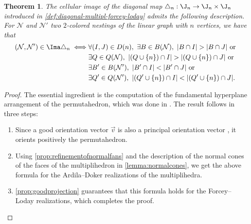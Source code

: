 \documentclass[JEP,XML,SOM,NoFloatCountersInSection,Unicode,published]{cedram}
\theoremstyle{definition}
\theoremstyle{plain}
\newtheorem{theorem}{Theorem}
\begin{document}
\begin{theorem}
\label{thm:formuladiagonal}
The cellular image of the diagonal map $\triangle_n : \J_n \to \J_n \times \J_n$ introduced in \cref{def:diagonal-multipl-forcey-loday} admits the following description.
For $\mathcal{N}$ and $\mathcal{N}'$ two $2$-colored nestings of the linear graph with $n$ vertices, we have that
\begin{align*}
(\mathcal{N},\mathcal{N}') \in \Ima\triangle_n
\iff & \forall (I,J) \in D(n),\ \exists B \in B(\mathcal{N}),\ |B\cap I|>|B\cap J| \text{ or } \\
& \exists Q \in Q(\mathcal{N}),\ |(Q\cup \{n\}) \cap I|>| (Q\cup \{n\}) \cap J| \text{ or } \\
& \exists B' \in B(\mathcal{N}'),\ |B'\cap I|<|B'\cap J| \text{ or } \\
& \exists Q' \in Q(\mathcal{N}'),\ |(Q'\cup \{n\}) \cap I|<| (Q'\cup \{n\}) \cap J|.
\end{align*}
\end{theorem}

\begin{proof}
The essential ingredient is the computation of the fundamental hyperplane arrangement of the permutahedron, which was done in \cite[\S 3.1]{LA21}. The result follows in three steps:
\begin{enumerate}
\item Since a good orientation vector $\vec v$ is also a principal orientation vector \cite[Def.\,3.15]{LA21}, it orients positively the permutahedron.
\item Using \cref{prop:refinementofnormalfans} and the description of the normal cones of the faces of the multiplihedron in \cref{lemma:normalcones}, we get the above formula for the Ardila--Doker realizations of the multiplihedra.
\item \cref{prop:goodprojection} guarantees that this formula holds for the Forcey--Loday realizations, which completes the proof.\qedhere
\end{enumerate}
\end{proof}
\end{document}
